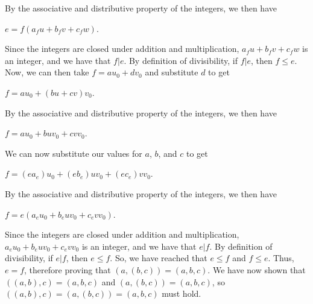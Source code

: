 \documentclass[12pt]{article}
\newenvironment{problem}[2][Problem]{\begin{trivlist}
\item[\hskip \labelsep {\bfseries #1}\hskip \labelsep {\bfseries #2.}]}{\end{trivlist}}
\begin{document}
\begin{problem}{2}
\noindent
By the associative and distributive property of the integers, we then have 

\begin{center}
$e=f(a_fu+b_fv+c_fw)$.
\end{center}

\noindent
Since the integers are closed under addition and multiplication, $a_fu+b_fv+c_fw$ is an integer, and we have that $f|e$. By definition of divisibility, if $f|e$, then $f \leq e$. Now, we can then take $f=au_0+dv_0$ and substitute $d$ to get

\begin{center}
$f=au_0+(bu+cv)v_0$.
\end{center}

\noindent
By the associative and distributive property of the integers, we then have 

\begin{center}
$f=au_0+buv_0+cvv_0$.
\end{center}

\noindent
We can now substitute our values for $a$, $b$, and $c$ to get 

\begin{center}
$f=(ea_e)u_0+(eb_e)uv_0+(ec_e)vv_0$.
\end{center}

\noindent
By the associative and distributive property of the integers, we then have 

\begin{center}
$f=e(a_eu_0+b_euv_0+c_evv_0)$.
\end{center}

\noindent
Since the integers are closed under addition and multiplication, $a_eu_0+b_euv_0+c_evv_0$ is an integer, and we have that $e|f$. By definition of divisibility, if $e|f$, then $e \leq f$. So, we have reached that $e \leq f$ and $f \leq e$. Thus, $e=f$, therefore proving that $(a,(b,c))=(a,b,c)$. We have now shown that $((a,b),c)=(a,b,c)$ and $(a,(b,c))=(a,b,c)$, so $((a,b),c)=(a,(b,c))=(a,b,c)$ must hold. \qedsymbol
\end{problem}

\end{document}
